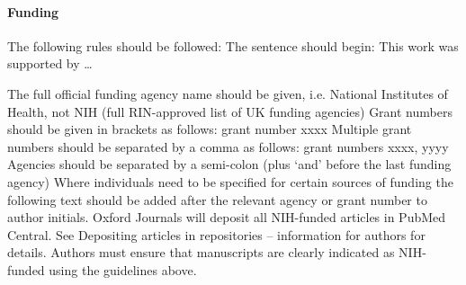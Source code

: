 \documentclass{bioinfo}
\begin{document}
\paragraph{Funding\textcolon}
The following rules should be followed:
The sentence should begin: This work was supported by …
 
The full official funding agency name should be given, i.e. National Institutes of Health, not NIH 
(full RIN-approved list of UK funding agencies) Grant numbers should be given in brackets as follows: grant number xxxx 
Multiple grant numbers should be separated by a comma as follows: grant numbers xxxx, yyyy 
Agencies should be separated by a semi-colon (plus ‘and’ before the last funding agency) 
Where individuals need to be specified for certain sources of funding the following text should be added after the
relevant agency or grant number to author initials.
Oxford Journals will deposit all NIH-funded articles in PubMed Central. See Depositing articles in repositories – 
information for authors for details. Authors must ensure that manuscripts are clearly indicated as NIH-funded using the guidelines above.










\end{document}
